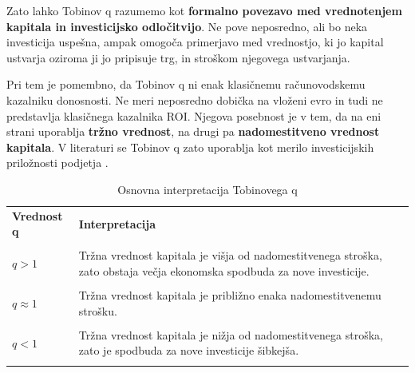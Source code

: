 \documentclass[12pt,a4paper]{article}
\begin{document}
Zato lahko Tobinov q razumemo kot \textbf{formalno povezavo med vrednotenjem kapitala in investicijsko odločitvijo}. Ne pove neposredno, ali bo neka investicija uspešna, ampak omogoča primerjavo med vrednostjo, ki jo kapital ustvarja oziroma ji jo pripisuje trg, in stroškom njegovega ustvarjanja.

Pri tem je pomembno, da Tobinov q ni enak klasičnemu računovodskemu kazalniku donosnosti. Ne meri neposredno dobička na vloženi evro in tudi ne predstavlja klasičnega kazalnika ROI. Njegova posebnost je v tem, da na eni strani uporablja \textbf{tržno vrednost}, na drugi pa \textbf{nadomestitveno vrednost kapitala}. V literaturi se Tobinov q zato uporablja kot merilo investicijskih priložnosti podjetja \citep{PetersTaylor2016}.

\begin{table}[htbp]

\centering

\caption{Osnovna interpretacija Tobinovega q}

\label{tab:interpretacija_q}

\begin{tabular}{p{3cm}p{10cm}}

\toprule

\textbf{Vrednost q} & \textbf{Interpretacija} \\\\

\midrule

$q>1$ &

Tržna vrednost kapitala je višja od nadomestitvenega stroška, zato obstaja večja ekonomska spodbuda za nove investicije. \\\\

$q\approx1$ &

Tržna vrednost kapitala je približno enaka nadomestitvenemu strošku. \\\\

$q<1$ &

Tržna vrednost kapitala je nižja od nadomestitvenega stroška, zato je spodbuda za nove investicije šibkejša. \\\\

\bottomrule

\end{tabular}

\end{table}

\end{document}

